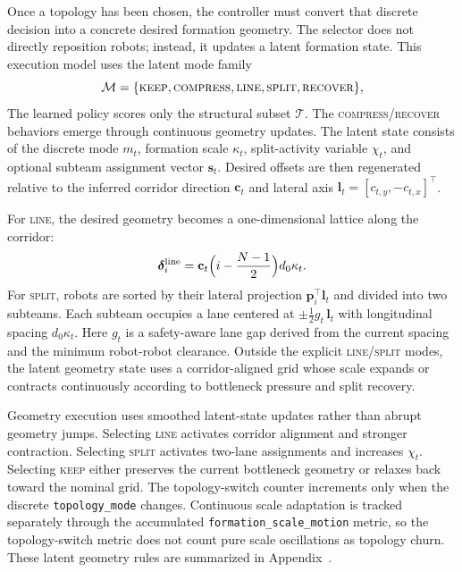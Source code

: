 \documentclass{ieeeaccess}
\newcommand{\cT}{\mathcal{T}}
\newcommand{\bfp}{\mathbf{p}}
\begin{document}
Once a topology has been chosen, the controller must convert that discrete decision into a concrete desired formation geometry. The selector does not directly reposition robots; instead, it updates a latent formation state. This execution model uses the latent mode family
\begin{equation}
\mathcal{M}=\{\textsc{keep},\textsc{compress},\textsc{line},
\textsc{split},\textsc{recover}\},
\end{equation}
The learned policy scores only the structural subset $\cT$. The
\textsc{compress}/\textsc{recover} behaviors emerge through continuous
geometry updates. The latent state consists of the discrete mode $m_t$,
formation scale $\kappa_t$, split-activity variable $\chi_t$, and
optional subteam assignment vector $\mathbf{s}_t$. Desired offsets are
then regenerated relative to the inferred corridor direction
$\mathbf{c}_t$ and lateral axis
$\mathbf{l}_t=[c_{t,y},-c_{t,x}]^\top$.

For \textsc{line}, the desired geometry becomes a one-dimensional lattice along the corridor:
\begin{equation}
\bm{\delta}_i^{\mathrm{line}} =
\mathbf{c}_t \Bigl(i-\frac{N-1}{2}\Bigr) d_0 \kappa_t.
\label{eq:line_offsets}
\end{equation}
For \textsc{split}, robots are sorted by their lateral projection
$\bfp_i^\top \mathbf{l}_t$ and divided into two subteams. Each subteam
occupies a lane centered at $\pm \tfrac{1}{2} g_t\,\mathbf{l}_t$ with
longitudinal spacing $d_0 \kappa_t$. Here $g_t$ is a safety-aware lane
gap derived from the current spacing and the minimum robot-robot
clearance. Outside the explicit \textsc{line}/\textsc{split} modes, the
latent geometry state uses a corridor-aligned grid whose scale expands
or contracts continuously according to bottleneck pressure and split
recovery.

Geometry execution uses smoothed latent-state updates rather than
abrupt geometry jumps. Selecting \textsc{line} activates corridor
alignment and stronger contraction. Selecting \textsc{split} activates
two-lane assignments and increases $\chi_t$. Selecting \textsc{keep}
either preserves the current bottleneck geometry or relaxes back toward
the nominal grid. The topology-switch counter increments only when the
discrete \texttt{topology\_mode} changes. Continuous scale adaptation
is tracked separately through the accumulated
\texttt{formation\_scale\_motion} metric, so the topology-switch metric
does not count pure scale oscillations as topology churn. These latent
geometry rules are summarized in Appendix~.
\end{document}
